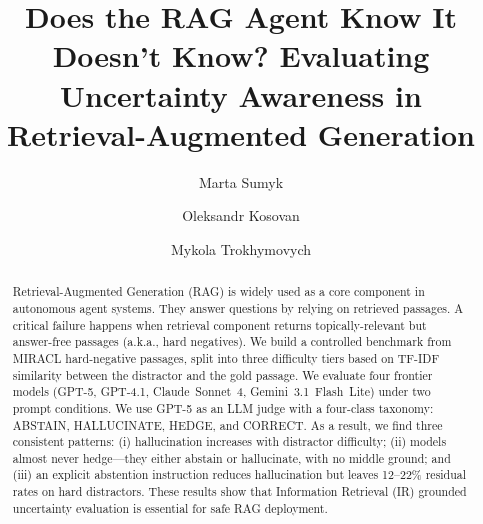 \documentclass[sigconf,review,anonymous]{acmart}
\begin{document}
\title[Does the RAG Agent Know It Doesn't Know?]{Does the RAG Agent Know It Doesn't Know? Evaluating Uncertainty Awareness in Retrieval-Augmented Generation}

\author{Marta Sumyk}

\author{Oleksandr Kosovan}

\author{Mykola Trokhymovych}

\renewcommand{\shortauthors}{Sumyk et al.}

\begin{abstract}
Retrieval-Augmented Generation (RAG) is widely used as a core component in autonomous agent systems. 
They answer questions by relying on retrieved passages. 
A critical failure happens when retrieval component returns topically-relevant but answer-free passages (a.k.a., hard negatives). 
We build a controlled benchmark from MIRACL hard-negative passages, split into three difficulty tiers based on TF-IDF similarity between the distractor and the gold passage. 
We evaluate four frontier models (GPT-5, GPT-4.1, Claude~Sonnet~4, Gemini~3.1~Flash~Lite) under two prompt conditions. 
We use GPT-5 as an LLM judge with a four-class taxonomy: ABSTAIN, HALLUCINATE, HEDGE, and CORRECT. 
As a result, we find three consistent patterns: (i) hallucination increases with distractor difficulty; (ii) models almost never hedge---they either abstain or hallucinate, with no middle ground; and (iii) an explicit abstention instruction reduces hallucination but leaves 12--22\% residual rates on hard distractors. 
These results show that Information Retrieval (IR) grounded uncertainty evaluation is essential for safe RAG deployment.
\end{abstract}

\end{document}
